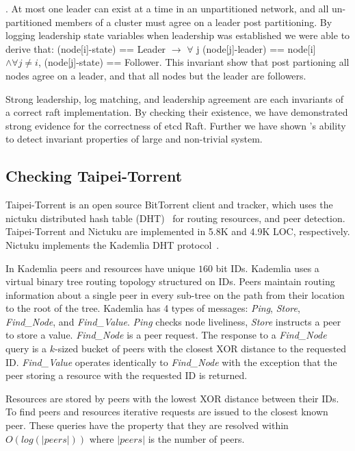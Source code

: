 . At most one leader can exist
at a time in an unpartitioned network, and all un-partitioned members
of a cluster must agree on a leader post partitioning. By logging
leadership state variables when leadership was established we were
able to derive that: (node[i]-state) == Leader $\rightarrow$ $\forall$
j (node[j]-leader) == node[i] $\wedge \forall j \neq i$,
(node[j]-state) == Follower. This invariant show that post partioning
all nodes agree on a leader, and that all nodes but the leader are
followers.

Strong leadership, log matching, and leadership agreement are each
invariants of a correct raft implementation. By checking their
existence, we have demonstrated strong evidence for the correctness of
etcd Raft. Further we have shown \dinv's ability to detect invariant
properties of large and non-trivial system.

\subsection{Checking Taipei-Torrent}

Taipei-Torrent is an open source BitTorrent client and tracker, which
uses the nictuku distributed hash table (DHT)~\cite{nictukudht} for
routing resources, and peer detection. Taipei-Torrent and Nictuku are
implemented in 5.8K and 4.9K LOC, respectively. Nictuku implements the
Kademlia DHT protocol~\cite{Maymounkov2002}.

In Kademlia peers and resources have unique $160$ bit IDs.  Kademlia
uses a virtual binary tree routing topology structured on IDs.  Peers
maintain routing information about a single peer in every sub-tree on
the path from their location to the root of the tree.  Kademlia has 4
types of messages: \emph{Ping}, \emph{Store}, \emph{Find\_Node}, and
\emph{Find\_Value}. \emph{Ping} checks node liveliness, \emph{Store}
instructs a peer to store a value.  \emph{Find\_Node} is a peer
request. The response to a \emph{Find\_Node} query is a $k$-sized
bucket of peers with the closest XOR distance to the requested
ID. \emph{Find\_Value} operates identically to \emph{Find\_Node} with
the exception that the peer storing a resource with the requested ID
is returned.

Resources are stored by peers with the lowest XOR distance between
their IDs. To find peers and resources iterative requests are issued
to the closest known peer. These queries have the property that they
are resolved within $O(log(|peers|))$ where $|peers|$ is the number of peers. 

